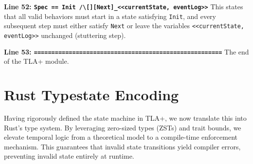 \textbf{Line 52: \texttt{Spec == Init /\textbackslash [][Next]\_<<currentState, eventLog>>}}
This states that all valid behaviors must start in a state satisfying \texttt{Init}, and every subsequent step must either satisfy \texttt{Next} or leave the variables \texttt{<<currentState, eventLog>>} unchanged (stuttering step).

\textbf{Line 53: \texttt{======================================================}}
The end of the TLA+ module.

\section{Rust Typestate Encoding}

Having rigorously defined the state machine in TLA+, we now translate this into Rust's type system. By leveraging zero-sized types (ZSTs) and trait bounds, we elevate temporal logic from a theoretical model to a compile-time enforcement mechanism. This guarantees that invalid state transitions yield compiler errors, preventing invalid state entirely at runtime.

